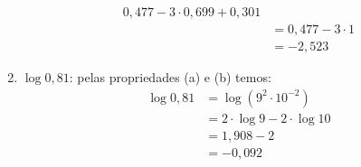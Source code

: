 \begin{enumerate}
\begin{align*}
        0,477 - 3 \cdot 0,699 + 0,301 \\ & =
        0,477 - 3 \cdot 1 \\ & =
        -2,523
    \end{align*}
    \item $\log 0,81$: pelas propriedades (a) e (b) temos:
    \begin{align*}
        \log 0,81 & = \log (9^2 \cdot 10^{-2}) \\ & =
        2 \cdot \log 9 -2 \cdot \log 10 \\ &=
        1,908 - 2 \\ & = -0,092
    \end{align*}
\end{enumerate}
